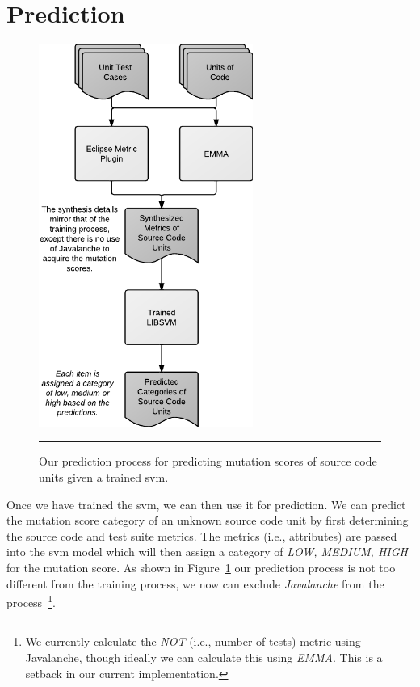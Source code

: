 \section{Prediction}
\label{sec:approach_prediction}
\begin{figure}[!tb]
  \centering
  \includegraphics[width=7cm]{figures/process_prediction.pdf}
  \caption{Our prediction process for predicting mutation scores of source code units given a trained \gls{svm}.}
  \label{fig:process_prediction}
  \vspace{2mm}
  \hrule
\end{figure}

Once we have trained the \gls{svm}, we can then use it for prediction. We can predict the mutation score category of an unknown source code unit by first determining the source code and test suite metrics. The metrics (i.e., attributes) are passed into the \gls{svm} model which will then assign a category of \textit{LOW, MEDIUM, HIGH} for the mutation score. As shown in Figure~\ref{fig:process_prediction} our prediction process is not too different from the training process, we now can exclude \emph{Javalanche} from the process~\footnote{We currently calculate the \emph{NOT} (i.e., number of tests) metric using Javalanche, though ideally we can calculate this using \emph{EMMA}. This is a setback in our current implementation.}.


